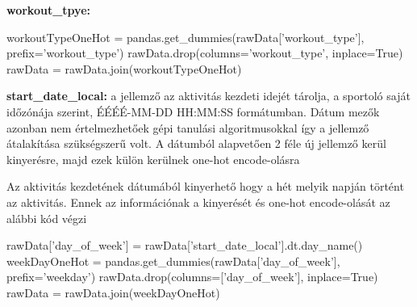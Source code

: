 \textbf{workout\_tpye:} 

\begin{programreszlet}
\begin{python}
workoutTypeOneHot = pandas.get_dummies(rawData['workout_type'], prefix='workout_type')
rawData.drop(columns='workout_type', inplace=True)
rawData = rawData.join(workoutTypeOneHot)
\end{python}
\end{programreszlet}


\textbf{start\_date\_local:} a jellemző az aktivitás kezdeti idejét tárolja, a sportoló saját időzónája szerint, ÉÉÉÉ-MM-DD HH:MM:SS formátumban. Dátum mezők azonban nem értelmezhetőek gépi tanulási algoritmusokkal így a jellemző átalakítása szükségszerű volt. A dátumból alapvetően 2 féle új jellemző kerül kinyerésre, majd ezek külön kerülnek one-hot encode-olásra

\begin{programreszlet}
Az aktivitás kezdetének dátumából kinyerhető hogy a hét melyik napján történt az aktivitás. Ennek az információnak a kinyerését és one-hot encode-olását az alábbi kód végzi
\begin{python}
rawData['day_of_week'] = rawData['start_date_local'].dt.day_name()
weekDayOneHot = pandas.get_dummies(rawData['day_of_week'], 
				   prefix='weekday')
rawData.drop(columns=['day_of_week'], inplace=True)
rawData = rawData.join(weekDayOneHot)
\end{python}		
\end{programreszlet}

